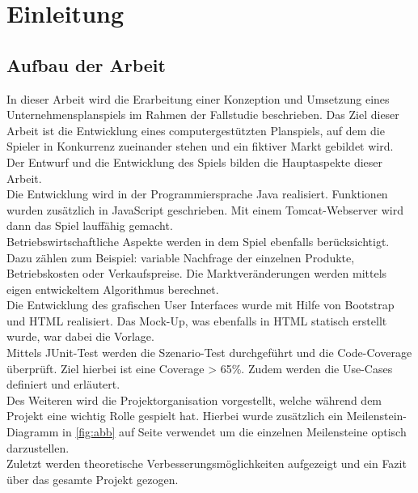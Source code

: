 \clearpage
\chapter{Einleitung}
\section{Aufbau der Arbeit}
In dieser Arbeit wird die Erarbeitung einer Konzeption und Umsetzung eines Unternehmensplanspiels im Rahmen der Fallstudie beschrieben. Das Ziel dieser Arbeit ist die Entwicklung eines computergestützten Planspiels, auf dem die Spieler in Konkurrenz zueinander stehen und ein fiktiver Markt gebildet wird. Der Entwurf und die Entwicklung des Spiels bilden die Hauptaspekte dieser Arbeit. \\
Die Entwicklung wird in der Programmiersprache Java realisiert. Funktionen wurden zusätzlich in JavaScript geschrieben. Mit einem Tomcat-Webserver wird dann das Spiel lauffähig gemacht. \\
Betriebswirtschaftliche Aspekte werden in dem Spiel ebenfalls berücksichtigt. Dazu zählen zum Beispiel: variable Nachfrage der einzelnen Produkte, Betriebskosten oder Verkaufspreise. Die Marktveränderungen werden mittels eigen entwickeltem Algorithmus berechnet. \\
Die Entwicklung des grafischen User Interfaces wurde mit Hilfe von Bootstrap und HTML realisiert. Das Mock-Up, was ebenfalls in HTML statisch erstellt wurde, war dabei die Vorlage. \\ 
Mittels JUnit-Test werden die Szenario-Test durchgeführt und die Code-Coverage überprüft. Ziel hierbei ist eine Coverage > 65\%. Zudem werden die Use-Cases definiert und erläutert. \\
Des Weiteren wird die Projektorganisation vorgestellt, welche während dem Projekt eine wichtig Rolle gespielt hat. Hierbei wurde zusätzlich ein Meilenstein-Diagramm in \ref{fig:abb} auf Seite \pageref{meilenstein} verwendet um die einzelnen Meilensteine optisch darzustellen.\\
Zuletzt werden theoretische Verbesserungsmöglichkeiten aufgezeigt und ein Fazit über das gesamte Projekt gezogen.

\clearpage
